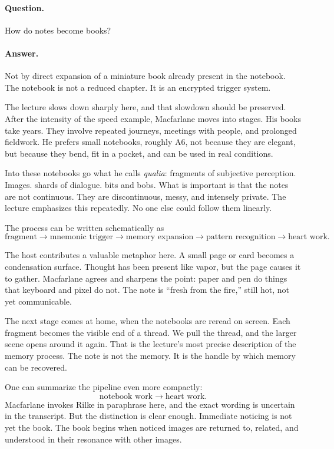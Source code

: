 \paragraph{Question.} How do notes become books?

\paragraph{Answer.} Not by direct expansion of a miniature book already present in the notebook. The notebook is not a reduced chapter. It is an encrypted trigger system.

The lecture slows down sharply here, and that slowdown should be preserved. After the intensity of the speed example, Macfarlane moves into stages. His books take years. They involve repeated journeys, meetings with people, and prolonged fieldwork. He prefers small notebooks, roughly A6, not because they are elegant, but because they bend, fit in a pocket, and can be used in real conditions.

Into these notebooks go what he calls \emph{qualia}: fragments of subjective perception. Images. shards of dialogue. bits and bobs. What is important is that the notes are not continuous. They are discontinuous, messy, and intensely private. The lecture emphasizes this repeatedly. No one else could follow them linearly.

The process can be written schematically as
\begin{equation}
\text{fragment} \longrightarrow \text{mnemonic trigger} \longrightarrow \text{memory expansion} \longrightarrow \text{pattern recognition} \longrightarrow \text{heart work}.
\end{equation}

The host contributes a valuable metaphor here. A small page or card becomes a condensation surface. Thought has been present like vapor, but the page causes it to gather. Macfarlane agrees and sharpens the point: paper and pen do things that keyboard and pixel do not. The note is ``fresh from the fire,'' still hot, not yet communicable.

The next stage comes at home, when the notebooks are reread on screen. Each fragment becomes the visible end of a thread. We pull the thread, and the larger scene opens around it again. That is the lecture's most precise description of the memory process. The note is not the memory. It is the handle by which memory can be recovered.

One can summarize the pipeline even more compactly:
\begin{equation}
\text{notebook work} \longrightarrow \text{heart work}.
\end{equation}
Macfarlane invokes Rilke in paraphrase here, and the exact wording is uncertain in the transcript. But the distinction is clear enough. Immediate noticing is not yet the book. The book begins when noticed images are returned to, related, and understood in their resonance with other images.

